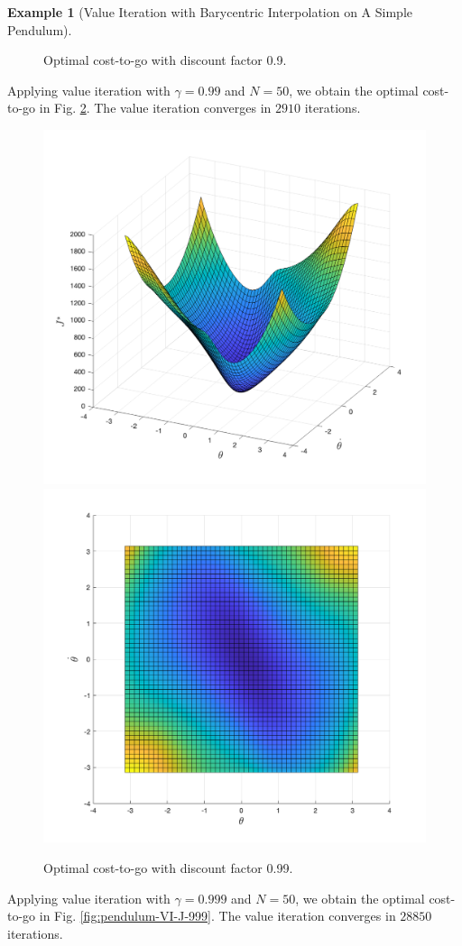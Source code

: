 \documentclass[
]{book}
\theoremstyle{definition}
\theoremstyle{definition}
\newtheorem{example}{Example}[chapter]
\theoremstyle{definition}
\theoremstyle{definition}
\theoremstyle{remark}
\begin{document}
\begin{example}[Value Iteration with Barycentric Interpolation on A Simple Pendulum]
\begin{figure}
{}

\caption{Optimal cost-to-go with discount factor 0.9.}\label{fig:pendulum-VI-J-9}
\end{figure}

Applying value iteration with \(\gamma=0.99\) and \(N=50\), we obtain the optimal cost-to-go in Fig. \ref{fig:pendulum-VI-J-99}. The value iteration converges in \(2910\) iterations.

\begin{figure}

{\centering \includegraphics[width=0.5\linewidth]{images/pendulum-VI-J-0.99-1} \includegraphics[width=0.5\linewidth]{images/pendulum-VI-J-0.99-2} 

}

\caption{Optimal cost-to-go with discount factor 0.99.}\label{fig:pendulum-VI-J-99}
\end{figure}

Applying value iteration with \(\gamma=0.999\) and \(N=50\), we obtain the optimal cost-to-go in Fig. \ref{fig:pendulum-VI-J-999}. The value iteration converges in \(28850\) iterations.

\begin{figure}


\end{figure}
\end{example}
\end{document}

